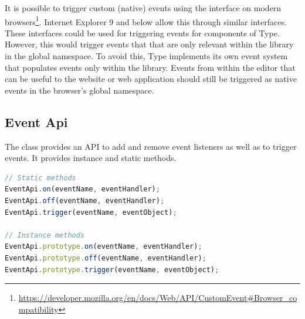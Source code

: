It is possible to trigger custom (native) events using the  interface on modern browsers\footnote{\url{https://developer.mozilla.org/en/docs/Web/API/CustomEvent\#Browser_compatibility}}. Internet Explorer 9 and below allow this through similar interfaces. These interfaces could be used for triggering events for components of Type. However, this would trigger events that that are only relevant within the library in the global namespace. To avoid this, Type implements its own event system that populates events only within the library. Events from within the editor that can be useful to the website or web application should still be triggered as native events in the browser's global namespace. %



\subsection{Event Api}

The  class provides an API to add and remove event listeners as well as to trigger events. It provides instance and static methods.

\begin{lstlisting}[language=JavaScript, caption={EventApi methods}, label=lst:eventapi_methods]
// Static methods
EventApi.on(eventName, eventHandler);
EventApi.off(eventName, eventHandler);
EventApi.trigger(eventName, eventObject);

// Instance methods
EventApi.prototype.on(eventName, eventHandler);
EventApi.prototype.off(eventName, eventHandler);
EventApi.prototype.trigger(eventName, eventObject);
\end{lstlisting}


